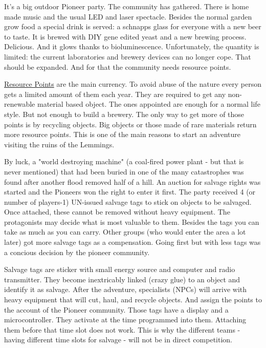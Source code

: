 It's a big outdoor Pioneer party. The community has gathered. There is home made music and the usual LED and laser spectacle. Besides the normal garden grow food a special drink is served: a schnapps glass for everyone with a new beer to taste.
It is brewed with DIY gene edited yeast and a new brewing process. Delicious. And it glows thanks to bioluminescence. Unfortunately, the quantity is limited: the current laboratories and brewery devices can no longer cope. That should be expanded. And for that the community needs resource points.

\begin{sidebarBox}[title=Resource points]
\hyperref[sec:Resource Points]{Resource Points} are the main currency. To avoid abuse of the nature every person gets a limited amount of them each year. They are required to get any non-renewable  material based object. The ones appointed are enough for a normal life style. But not enough to build a brewery. The only way to get more of those points is by recycling objects. Big objects or those made of rare materials return more resource points. This is one of the main reasons to start an adventure visiting the ruins of the Lemmings. 
\end{sidebarBox}

By luck, a "world destroying machine" (a coal-fired power plant - but that is never mentioned) that had been buried in one of the many catastrophes was found after another flood removed half of a hill. An auction for salvage rights was started and the Pioneers won the right to enter it first.
The party received 4 (or number of players-1) UN-issued salvage tags to stick on objects to be salvaged. Once attached, these cannot be removed without heavy equipment. The protagonists may decide what is most valuable to them. Besides the tags you can take as much as you can carry.
Other groups (who would enter the area a lot later) got more salvage tags as a compensation. Going first but with less tags was a concious decision by the pioneer community.

\begin{sidebarBox}[title=Salvage tags]
Salvage tags are sticker with small energy source and computer and radio transmitter. They become inextricably linked (crazy glue) to an object and identify it as salvage. After the adventure, specialists (NPCs) will arrive with heavy equipment that will cut, haul, and recycle objects. And assign the points to the account of the Pioneer community.
Those tags have a display and a microcontroller. They activate at the time programmed into them. Attaching them before that time slot does not work. This is why the different teams - having different time slots for salvage - will not be in direct competition.
\end{sidebarBox}

